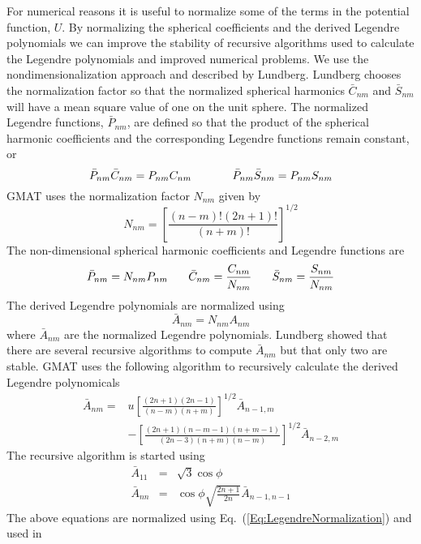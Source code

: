 For numerical reasons it is useful to normalize some of the terms in
the potential function, $U$.  By normalizing the spherical
coefficients and the derived Legendre polynomials we can improve the
stability of recursive algorithms used to calculate the Legendre
polynomials and improved numerical problems.  We use the
nondimensionalization approach and described by
Lundberg\cite{Lundberg:88}.  Lundberg chooses the normalization
factor so that the normalized spherical harmonics $\bar{C}_{nm}$ and
$\bar{S}_{nm}$ will have a mean square value of one on the unit
sphere.  The normalized Legendre functions, $\bar{P}_{nm}$, are
defined so that the product of the spherical harmonic coefficients
and the corresponding Legendre functions remain constant, or
%
\begin{equation}
   \bar{P}_{nm}\bar{C}_{nm} = P_{nm}C_{nm}  \hspace{.5 in}  \bar{P}_{nm}\bar{S}_{nm} = P_{nm}S_{nm}
\end{equation}
%
GMAT uses the normalization factor $N_{nm}$ given by
%
\begin{equation}
    N_{nm} =  \left[ \frac{(n-m)!(2n+1)!}{(n+m)!} \right]^{1/2}
\end{equation}
%
The non-dimensional spherical harmonic coefficients and Legendre
functions are
%
\begin{equation}
     \bar{P}_{nm} = N_{nm}P_{nm} \hspace{.25 in} \bar{C}_{nm} =
     \frac{C_{nm}}{N_{nm}} \hspace{.25 in} \bar{S}_{nm} =
     \frac{S_{nm}}{N_{nm}}
\end{equation}
%
The derived Legendre polynomials are normalized using
%
\begin{equation}
    \bar{A}_{nm} = N_{nm} A_{nm} \label{Eq:LegendreNormalization}
\end{equation}
%
where $\bar{A}_{nm}$ are the normalized Legendre polynomials.
Lundberg\cite{Lundberg:88} showed that there are several recursive
algorithms to compute $\bar{A}_{nm}$  but that only two are stable.
GMAT uses the following algorithm to recursively calculate the
derived Legendre polynomicals
%
\begin{equation}
     \begin{split}
     \bar{A}_{nm} = & u\left[ \frac{(2n+1)(2n-1)}{(n-m)(n+m)}
     \right]^{1/2}\bar{A}_{n-1,m}  \\
     & - \left[ \frac{(2n+1)(n-m-1)(n+m-1)}{(2n-3)(n+m)(n-m)}
     \right]^{1/2}\bar{A}_{n-2,m}
     \end{split}
\end{equation}
%
The recursive algorithm is started using
%
\begin{eqnarray}
     \bar{A}_{11} & = & \sqrt{3} \cos{\phi}\\
     \bar{A}_{nn} & = & \cos{\phi}\sqrt{\frac{2n+1}{2n}}\bar{A}_{n-1,n-1}
\end{eqnarray}
%
The above equations are normalized using
Eq.~(\ref{Eq:LegendreNormalization}) and used in


